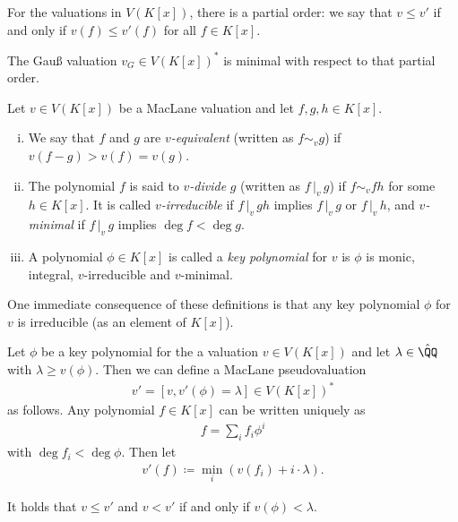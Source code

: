 For the valuations in $V(K[x])$, there is a partial order: we say that $v \leq v'$ if and only if $v(f) \leq v'(f)$ for all $f\in K[x]$.

\begin{example}
    The Gauß valuation $v_{\scriptscriptstyle G} \in V(K[x])^*$ is minimal with respect to that partial order.
\end{example}

\begin{definition}
    Let $v\in V(K[x])$ be a MacLane valuation and let $f,g,h \in K[x]$.
    \begin{enumerate}[(i)]
        \item We say that $f$ and $g$ are \textit{$v$-equivalent} (written as $f \sim_v g$) if $v(f-g) > v(f) = v(g)$.
        \item The polynomial $f$ is said to \textit{$v$-divide} $g$ (written as $f\, |_v\, g$) if $f \sim_v fh$ for some $h \in K[x]$.
            It is called \textit{$v$-irreducible} if $f\, |_v\, gh$ implies $f\, |_v\, g$ or $f\, |_v\, h$,
            and \textit{$v$-minimal} if $f\, |_v\, g$ implies $\deg f < \deg g$.
        \item A polynomial $\phi \in K[x]$ is called a \textit{key polynomial} for $v$ is $\phi$ is monic, integral, $v$-irreducible and $v$-minimal.
    \end{enumerate}
\end{definition}

\begin{remark}
    One immediate consequence of these definitions is that any key polynomial $\phi$ for $v$ is irreducible (as an element of $K[x]$).
\end{remark}

Let $\phi$ be a key polynomial for the a valuation $v \in V(K[x])$ and let $\lambda \in \hat{\QQ}$ with $\lambda \geq v(\phi)$.
Then we can define a MacLane pseudovaluation 
\begin{align} \label{eq:def-augmentation}
    v' = [v, v'(\phi) = \lambda] \in V(K[x])^*
\end{align}
as follows.
Any polynomial $f \in K[x]$ can be written uniquely as 
\begin{align}
    f = \sum_i f_i \phi^i
\end{align}
with $\deg f_i < \deg \phi$. Then let 
\begin{align}
    v'(f) \coloneqq \min_i(v(f_i) + i\cdot \lambda).
\end{align}

It holds that $v\leq v'$ and $v < v'$ if and only if $v(\phi) < \lambda$.

